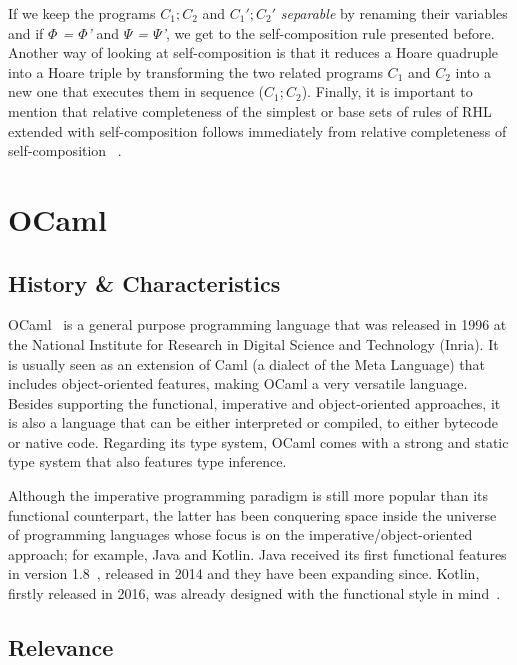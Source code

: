 If we keep the programs \emph{$C_1;C_2$} and \emph{$C_1';C_2'$} \emph{separable} by renaming their variables and if \emph{$\Phi$ = $\Phi$'} and \emph{$\Psi$ = $\Psi$'}, we get to the self-composition rule presented before.
Another way of looking at self-composition is that it reduces a Hoare quadruple into a Hoare triple by transforming the two related programs \emph{$C_1$} and \emph{$C_2$} into a new one that executes them in sequence (\emph{$C_1; C_2$}).
Finally, it is important to mention that relative completeness of the simplest or base sets of rules of RHL extended with self-composition follows immediately from relative completeness of self-composition ~\cite{DBLP:journals/jlp/BartheCK16}.


\section{OCaml}
\label{sec:ocaml}

\subsection{History \& Characteristics} 
\label{sub:overview}

OCaml~\cite{ocaml} is a general purpose programming language that was released in 1996 at the National Institute for Research in Digital Science and Technology (Inria).
It is usually seen as an extension of Caml (a dialect of the Meta Language) that includes object-oriented features, making OCaml a very versatile language.
Besides supporting the functional, imperative and object-oriented approaches, it is also a language that can be either interpreted or compiled, to either bytecode or native code.
Regarding its type system, OCaml comes with a strong and static type system that also features type inference.

Although the imperative programming paradigm is still more popular than its functional counterpart, the latter has been conquering space inside the universe of programming languages whose focus is on the imperative/object-oriented approach; for example, Java and Kotlin.
Java received its first functional features in version 1.8~\cite{java}, released in 2014 and they have been expanding since.
Kotlin, firstly released in 2016, was already designed with the functional style in mind~\cite{kotlin}.


\subsection{Relevance} 
\label{sub:relevance}

